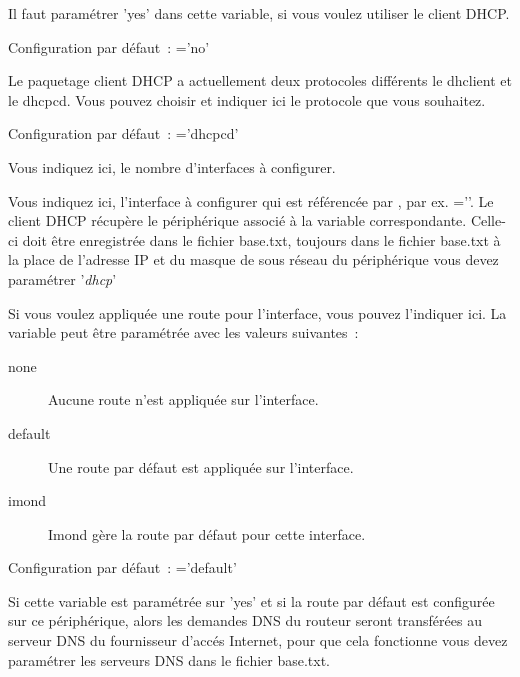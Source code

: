 \begin{description}

Il faut paramétrer 'yes' dans cette variable, si vous voulez utiliser
le client DHCP.

      Configuration par défaut~: ='no'


Le paquetage client DHCP a actuellement deux protocoles différents le dhclient
et le dhcpcd. Vous pouvez choisir et indiquer ici le protocole que vous souhaitez.

      Configuration par défaut~: ='dhcpcd'


Vous indiquez ici, le nombre d'interfaces à configurer.


Vous indiquez ici, l'interface à configurer qui est référencée par ,
par ex. =''. Le client DHCP récupère
le périphérique associé à la variable correspondante. Celle-ci doit être
enregistrée dans le fichier base.txt, toujours dans le fichier base.txt à la
place de l'adresse IP et du masque de sous réseau du périphérique vous devez
paramétrer '\emph{dhcp}'


Si vous voulez appliquée une route pour l'interface, vous pouvez l'indiquer ici.
La variable peut être paramétrée avec les valeurs suivantes~:
\begin{description}
\item[none] Aucune route n'est appliquée sur l'interface.
\item[default] Une route par défaut est appliquée sur l'interface.
\item[imond] Imond gère la route par défaut pour cette interface.
\end{description}

      Configuration par défaut~: ='default'


Si cette variable est paramétrée sur 'yes' et si la route par défaut est
configurée sur ce périphérique, alors les demandes DNS du routeur seront
transférées au serveur DNS du fournisseur d'accés Internet, pour que cela
fonctionne vous devez paramétrer les serveurs DNS dans le fichier base.txt.


\end{description}
